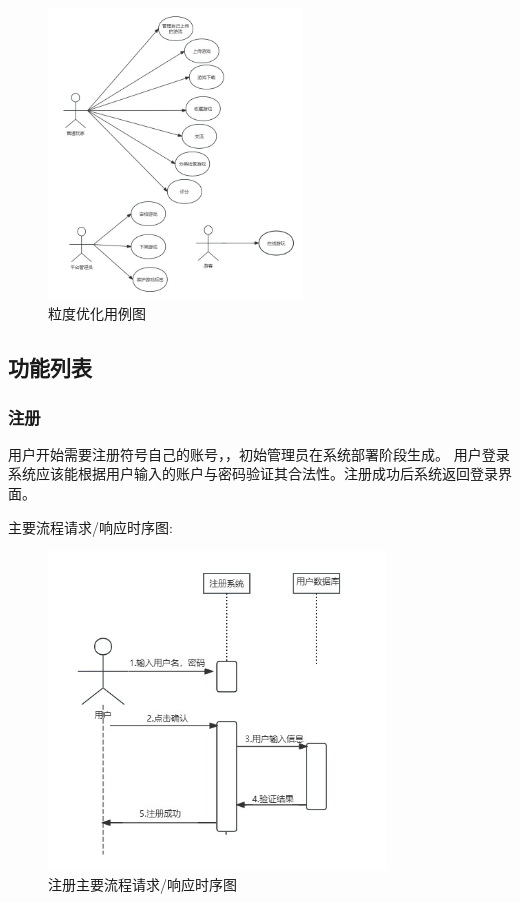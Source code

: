 \documentclass[12pt]{ctexart} %
\begin{document}
\begin{figure}[htbp]
  \centering
  \includegraphics[width=0.6\textwidth]{yongli.jpg}
  \caption{粒度优化用例图}
  \label{fig:all-use-case-unorg}
\end{figure}

\subsection{功能列表}
\subsubsection{注册}
用户开始需要注册符号自己的账号，，初始管理员在系统部署阶段生成。
用户登录系统应该能根据用户输入的账户与密码验证其合法性。注册成功后系统返回登录界面。

主要流程请求/响应时序图:

\begin{figure}[htbp]
  \centering
  \includegraphics[width=0.8\textwidth]{yongli1.jpg}
  \caption{注册主要流程请求/响应时序图}
\end{figure}
\end{document}
